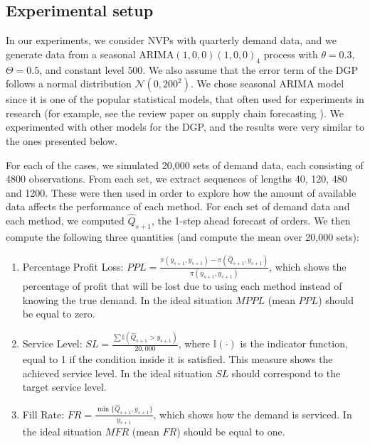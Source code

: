 \documentclass[a4paper,11pt]{article}
\begin{document}
\subsection{Experimental setup}

In our experiments, we consider NVPs with quarterly demand data, and we generate data from a seasonal ARIMA$(1,0,0)(1,0,0)_4$ process with $\theta=0.3$, $\Theta=0.5$, and constant level $500$. We also assume that the error term of the DGP follows a normal distribution $\mathcal{N}(0,200^2)$. We chose seasonal ARIMA model since it is one of the popular statistical models, that often used for experiments in research (for example, see the review paper on supply chain forecasting \cite{SBBKN16}). We experimented with other models for the DGP, and the results were very similar to the ones presented below.

For each of the cases, we simulated 20,000 sets of demand data, each consisting of 4800 observations. From each set, we extract sequences of lengths 40, 120, 480 and 1200. These were then used in order to explore how the amount of available data affects the performance of each method. For each set of demand data and each method, we computed $\hat{Q}_{s+1}$, the 1-step ahead forecast of orders. We then compute the following three quantities (and compute the mean over 20,000 sets):
\begin{enumerate}
    \item Percentage Profit Loss:  $PPL=\frac{\pi(y_{s+1},y_{s+1})-\pi(\hat{Q}_{s+1},y_{s+1})}{\pi(y_{s+1},y_{s+1})}$, which shows the percentage of profit that will be lost due to using each method instead of knowing the true demand. In the ideal situation $MPPL$ (mean $PPL$) should be equal to zero.
    \item Service Level: $SL=\frac{\sum\mathbb {I}{(\hat{Q}_{s+1}>y_{s+1})}}{20,000}$, where $\mathbb {I}(\cdot)$ is the indicator function, equal to 1 if the condition inside it is satisfied. This measure shows the achieved service level. In the ideal situation $SL$ should correspond to the target service level.
    \item Fill Rate: $FR=\frac{\min\{\hat{Q}_{s+1},y_{s+1}\}}{y_{s+1}}$, which shows how the demand is serviced. In the ideal situation $MFR$ (mean $FR$) should be equal to one.
\end{enumerate}
\end{document}
